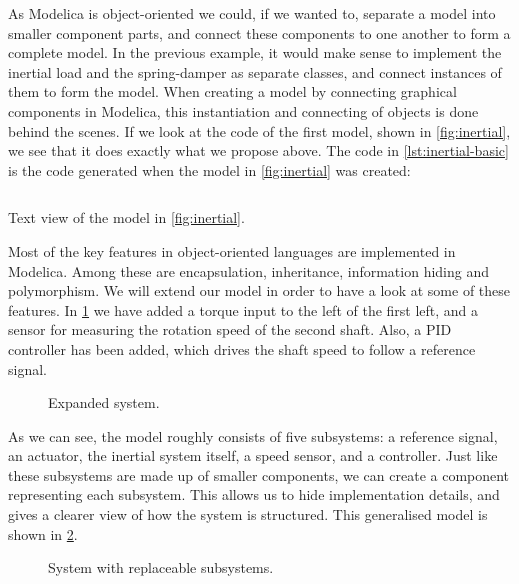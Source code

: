 \documentclass[\rootfolder/main.tex]{subfiles}
\begin{document}
As Modelica is object-oriented we could, if we wanted to, separate a model into smaller component parts, and connect these components to one another to form a complete model.
In the previous example, it would make sense to implement the inertial load and the spring-damper as separate classes, and connect instances of them to form the model.
When creating a model by connecting graphical components in Modelica, this instantiation and connecting of objects is done behind the scenes.
If we look at the code of the first model, shown in \cref{fig:inertial}, we see that it does exactly what we propose above.
The code in \cref{lst:inertial-basic} is the code generated when the model in \cref{fig:inertial} was created\footnotemark:


\begin{listing}[ht]
    \inputminted[fontsize=\footnotesize]{Modelica}{\rootfolder/Models/MasterProject/Models/InertialBasic2.mo}
    \caption{Text view of the model in \cref{fig:inertial}.\label{lst:inertial-basic}}
\end{listing}

Most of the key features in object-oriented languages are implemented in Modelica.
Among these are encapsulation, inheritance, information hiding and polymorphism.
We will extend our model in order to have a look at some of these features.
In \cref{fig:inertial-expanded} we have added a torque input to the left of the first left, and a sensor for measuring the rotation speed of the second shaft.
Also, a PID controller has been added, which drives the shaft speed to follow a reference signal.

\begin{figure}[ht]
    \caption{Expanded system.\label{fig:inertial-expanded}}
\end{figure}

As we can see, the model roughly consists of five subsystems: a reference signal, an actuator, the inertial system itself, a speed sensor, and a controller.
Just like these subsystems are made up of smaller components, we can create a component representing each subsystem.
This allows us to hide implementation details, and gives a clearer view of how the system is structured.
This generalised model is shown in \cref{fig:inertial-architecture}.

\begin{figure}[ht]
    \caption{System with replaceable subsystems.\label{fig:inertial-architecture}}
\end{figure}
\end{document}
